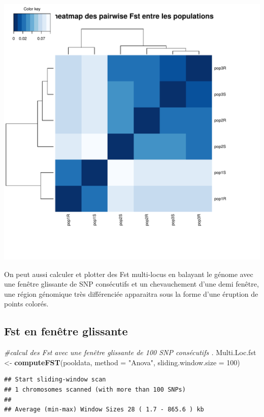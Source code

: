 \documentclass[
  openany]{book}
\newenvironment{Shaded}{\begin{snugshade}}{\end{snugshade}}
\newcommand{\AttributeTok}[1]{\textcolor[rgb]{0.13,0.29,0.53}{#1}}
\newcommand{\CommentTok}[1]{\textcolor[rgb]{0.56,0.35,0.01}{\textit{#1}}}
\newcommand{\DecValTok}[1]{\textcolor[rgb]{0.00,0.00,0.81}{#1}}
\newcommand{\FunctionTok}[1]{\textcolor[rgb]{0.13,0.29,0.53}{\textbf{#1}}}
\newcommand{\NormalTok}[1]{#1}
\newcommand{\OtherTok}[1]{\textcolor[rgb]{0.56,0.35,0.01}{#1}}
\newcommand{\StringTok}[1]{\textcolor[rgb]{0.31,0.60,0.02}{#1}}
\theoremstyle{definition}
\theoremstyle{definition}
\theoremstyle{definition}
\theoremstyle{definition}
\theoremstyle{remark}
\begin{document}
\includegraphics{BayPass_Fr_files/figure-latex/heatmap-PW-fst-1.pdf}

On peut aussi calculer et plotter des Fst multi-locus en balayant le génome avec une fenêtre glissante de SNP consécutifs et un chevauchement d'une demi fenêtre, une région génomique très différenciée apparaitra sous la forme d'une éruption de points colorés.

\hypertarget{fst-en-fenuxeatre-glissante}{%
\subsection*{Fst en fenêtre glissante}\label{fst-en-fenuxeatre-glissante}}

\begin{Shaded}
\begin{Highlighting}[]
\CommentTok{\#calcul des Fst avec une fenêtre glissante de 100 SNP consécutifs .}
\NormalTok{Multi.Loc.fst }\OtherTok{\textless{}{-}} \FunctionTok{computeFST}\NormalTok{(pooldata, }\AttributeTok{method =} \StringTok{"Anova"}\NormalTok{, }\AttributeTok{sliding.window.size =} \DecValTok{100}\NormalTok{)}
\end{Highlighting}
\end{Shaded}

\begin{verbatim}
## Start sliding-window scan
## 1 chromosomes scanned (with more than 100 SNPs)
## 
## Average (min-max) Window Sizes 28 ( 1.7 - 865.6 ) kb
\end{verbatim}
\end{document}
